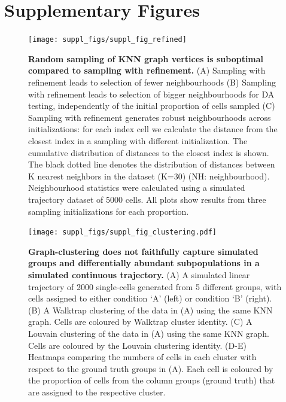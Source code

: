 \documentclass[
]{article}
\author{}
\date{\vspace{-2.5em}}
\begin{document}
\renewcommand{\figurename}{Supplementary Figure}
\renewcommand{\tablename}{Supplementary Table}

\newpage

\hypertarget{supplementary-figures}{%
\section*{Supplementary Figures}\label{supplementary-figures}}

\begin{figure}
\texttt{[image: suppl\_figs/suppl\_fig\_refined]} \caption{\textbf{Random sampling of KNN graph vertices is suboptimal compared to sampling with refinement.}
(A) Sampling with refinement leads to selection of fewer neighbourhoods
(B) Sampling with refinement leads to selection of bigger neighbourhoods for DA testing, independently of the initial proportion of cells sampled
(C) Sampling with refinement generates robust neighbourhoods across initializations: for each index cell we calculate the distance from the closest index in a sampling with different initialization. The cumulative distribution of distances to the closest index is shown. The black dotted line denotes the distribution of distances between K nearest neighbors in the dataset (K=30) (NH: neighbourhood).
Neighbourhood statistics were calculated using a simulated trajectory dataset of 5000 cells. All plots show results from three sampling initializations for each proportion.}\label{fig:sup-fig-refined}
\end{figure}







\begin{figure}
\centering
\texttt{[image: suppl\_figs/suppl\_fig\_clustering.pdf]}
\caption{\label{fig:sup-fig-clustering}\textbf{Graph-clustering does not faithfully capture simulated groups and differentially abundant subpopulations in a simulated continuous trajectory.}
(A) A simulated linear trajectory of 2000 single-cells generated from 5 different groups, with cells assigned to either condition `A' (left) or condition `B' (right).
(B) A Walktrap clustering of the data in (A) using the same KNN graph. Cells are coloured by Walktrap cluster identity.
(C) A Louvain clustering of the data in (A) using the same KNN graph. Cells are coloured by the Louvain clustering identity.
(D-E) Heatmaps comparing the numbers of cells in each cluster with respect to the ground truth groups in (A). Each cell is coloured by the proportion of cells from the column groups (ground truth) that are assigned to the respective cluster.}
\end{figure}
\end{document}

